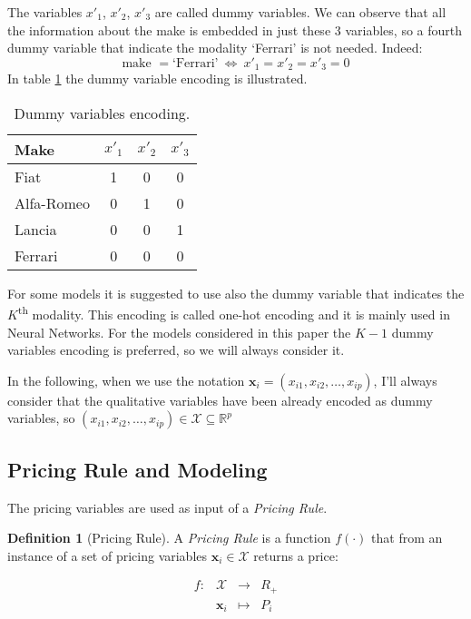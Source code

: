 \documentclass[a4paper, nobind]{templates/ociamthesis}
\theoremstyle{definition}
\newtheorem{definition}{Definition}[chapter]
\theoremstyle{definition}
\theoremstyle{definition}
\theoremstyle{remark}
\begin{document}
The variables \(x'_1\), \(x'_2\), \(x'_3\) are called dummy variables. We can observe that all the information about the make is embedded in just these 3 variables, so a fourth dummy variable that indicate the modality `Ferrari' is not needed. Indeed:
\[
\text{make } = \text{`Ferrari'} \ \Longleftrightarrow \ x'_1=x'_2=x'_3=0
\]
In table \ref{tab:dummy-variables} the dummy variable encoding is illustrated.

\begin{table}[!h]

\caption{\label{tab:dummy-variables}Dummy variables encoding.}
\centering
\begin{tabular}[t]{lccc}

\textbf{Make} & \textbf{$x'_1$} & \textbf{$x'_2$} & \textbf{$x'_3$}\\
\midrule\addlinespace
Fiat & 1 & 0 & 0\\
Alfa-Romeo & 0 & 1 & 0\\
Lancia & 0 & 0 & 1\\
Ferrari & 0 & 0 & 0\\

\end{tabular}
\end{table}

For some models it is suggested to use also the dummy variable that indicates the \(K\)\textsuperscript{th} modality. This encoding is called one-hot encoding and it is mainly used in Neural Networks. For the models considered in this paper the \(K-1\) dummy variables encoding is preferred, so we will always consider it.

In the following, when we use the notation \(\boldsymbol{x}_i=(x_{i1}, x_{i2}, \dots, x_{ip})\), I'll always consider that the qualitative variables have been already encoded as dummy variables, so \((x_{i1}, x_{i2}, \dots, x_{ip})\in \mathcal{X} \subseteq \mathbb{R}^p\)

\hypertarget{pricing-rule-and-modeling}{%
\subsection{Pricing Rule and Modeling}\label{pricing-rule-and-modeling}}

The pricing variables are used as input of a \emph{Pricing Rule}.

\begin{definition}[Pricing Rule]
\label{def:pricing-rule} \iffalse (Pricing Rule) \fi{} A \emph{Pricing Rule} is a function \(f(\cdot)\) that from an instance of a set of pricing variables \(\boldsymbol{x}_i\in\mathcal{X}\) returns a price:

\[  
\begin{array}{rccl}
f: & \mathcal{X}      & \longrightarrow  & R_+ \\
   & \boldsymbol{x}_i & \longmapsto      & P_i \\
\end{array}
\]
\end{definition}
\end{document}

